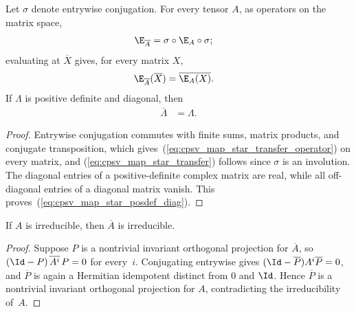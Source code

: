 \begin{lemma}
    \label{thm:cpsv_map_star_transfer_fixed_point}
    \leanok
    Let $\sigma$ denote entrywise conjugation. For every tensor $A$, as
    operators on the matrix space,
    \begin{align}
        \E_{\overline A}
         & =\sigma\circ\E_A\circ\sigma;
        \label{eq:cpsv_map_star_transfer_operator}
    \end{align}
    evaluating at $\overline X$ gives, for every matrix $X$,
    \begin{align}
        \E_{\overline A}(\overline X)
         & =\overline{\E_A(X)}.
        \label{eq:cpsv_map_star_transfer}
    \end{align}
    If $\Lambda$ is positive definite and diagonal, then
    \begin{align}
        \overline\Lambda & =\Lambda.
        \label{eq:cpsv_map_star_posdef_diag}
    \end{align}
\end{lemma}

\begin{proof}\leanok
    Entrywise conjugation commutes with finite sums, matrix products, and
    conjugate transposition, which
    gives~(\ref{eq:cpsv_map_star_transfer_operator}) on every matrix, and
    (\ref{eq:cpsv_map_star_transfer}) follows since $\sigma$ is an
    involution. The diagonal entries of a
    positive-definite complex matrix are real, while all off-diagonal entries
    of a diagonal matrix vanish. This proves~(\ref{eq:cpsv_map_star_posdef_diag}).
\end{proof}

\begin{lemma}%
    \label{thm:cpsv_map_star_irreducible}
    \leanok
    If $A$ is irreducible, then $\overline A$ is irreducible.
\end{lemma}

\begin{proof}\leanok
    Suppose $P$ is a nontrivial invariant orthogonal projection for
    $\overline A$, so $(\Id-P)\,\overline{A^i}\,P=0$ for every~$i$.
    Conjugating entrywise gives
    $(\Id-\overline P)A^i\overline P=0$, and $\overline P$ is again a
    Hermitian idempotent distinct from $0$ and $\Id$. Hence $\overline P$ is
    a nontrivial invariant orthogonal projection for $A$, contradicting the
    irreducibility of~$A$.
\end{proof}

